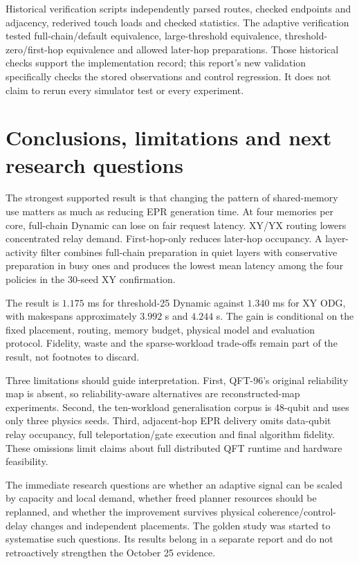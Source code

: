 \documentclass[11pt,a4paper,oneside]{report}
\begin{document}
Historical verification scripts independently parsed routes, checked endpoints and adjacency, rederived touch loads and checked statistics. The adaptive verification tested full-chain/default equivalence, large-threshold equivalence, threshold-zero/first-hop equivalence and allowed later-hop preparations. Those historical checks support the implementation record; this report's new validation specifically checks the stored observations and control regression. It does not claim to rerun every simulator test or every experiment.

\chapter{Conclusions, limitations and next research questions}
The strongest supported result is that changing the pattern of shared-memory use matters as much as reducing EPR generation time. At four memories per core, full-chain Dynamic can lose on fair request latency. XY/YX routing lowers concentrated relay demand. First-hop-only reduces later-hop occupancy. A layer-activity filter combines full-chain preparation in quiet layers with conservative preparation in busy ones and produces the lowest mean latency among the four policies in the 30-seed XY confirmation.

The result is $1.175$ ms for threshold-25 Dynamic against $1.340$ ms for XY ODG, with makespans approximately $3.992$ s and $4.244$ s. The gain is conditional on the fixed placement, routing, memory budget, physical model and evaluation protocol. Fidelity, waste and the sparse-workload trade-offs remain part of the result, not footnotes to discard.

Three limitations should guide interpretation. First, QFT-96's original reliability map is absent, so reliability-aware alternatives are reconstructed-map experiments. Second, the ten-workload generalisation corpus is 48-qubit and uses only three physics seeds. Third, adjacent-hop EPR delivery omits data-qubit relay occupancy, full teleportation/gate execution and final algorithm fidelity. These omissions limit claims about full distributed QFT runtime and hardware feasibility.

The immediate research questions are whether an adaptive signal can be scaled by capacity and local demand, whether freed planner resources should be replanned, and whether the improvement survives physical coherence/control-delay changes and independent placements. The golden study was started to systematise such questions. Its results belong in a separate report and do not retroactively strengthen the October 25 evidence.
\end{document}
